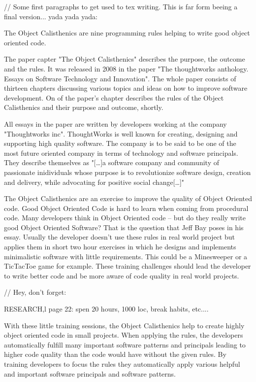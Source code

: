 \begin{itshape}
// Some first paragraphs to get used to tex writing. This is far form beeing a final version... yada yada yada: 

The Object Calisthenics are nine programming rules helping to write good object oriented code.

The paper capter "The Object Calisthenics" describes the purpose, the outcome and the rules. It was released in 2008 in the paper "The thoughtworks anthology. Essays on Software Technology and Innovation"\cite[p. 70-79]{oc2008}. The whole paper consists of thirteen chapters discussing various topics and ideas on how to improve software development. On of the paper's chapter describes the rules of the Object Calisthenics and their purpose and outcome, shortly.

All essays in the paper are written by developers working at the company "Thoughtworks inc". ThoughtWorks is well known for creating, designing and supporting high quality software. The company is to be said to be one of the most future oriented company in terms of technology and software principals. They describe themselves as "[\dots]a software company and community of passionate inidividuals whose purpose is to revolutionize software design, creation and delivery, while advocating for positive social change[\dots]"\cite{twWeb}

The Object Calisthenics are an exercise to improve the quality of Object Oriented code. Good Object Oriented Code is hard to learn when coming from procedural code. Many developers think in Object Oriented code – but do they really write good Object Oriented Software? That is the question that Jeff Bay poses in his essay. 
Usually the developer doesn't use these rules in real world project but applies them in short two hour exercises in which he designs and implements minimalistic software with little requirements. This could be a Minesweeper or a TicTacToe game for example. These training challenges should lead the developer to write better code and be more aware of code quality in real world projects.

// Hey, don't forget: 

RESEARCH,l page 22: spen 20 hours, 1000 loc, break habits, etc....

With these little training sessions, the Object Calisthenics help to create highly object oriented code  in small projects. When applying the rules, the developers automatically fulfill many important software patterns and principals leading to higher code quality than the code would have without the given rules. By training developers to focus the rules they automatically apply various helpful and important software principals and software patterns. 


\end{itshape}
